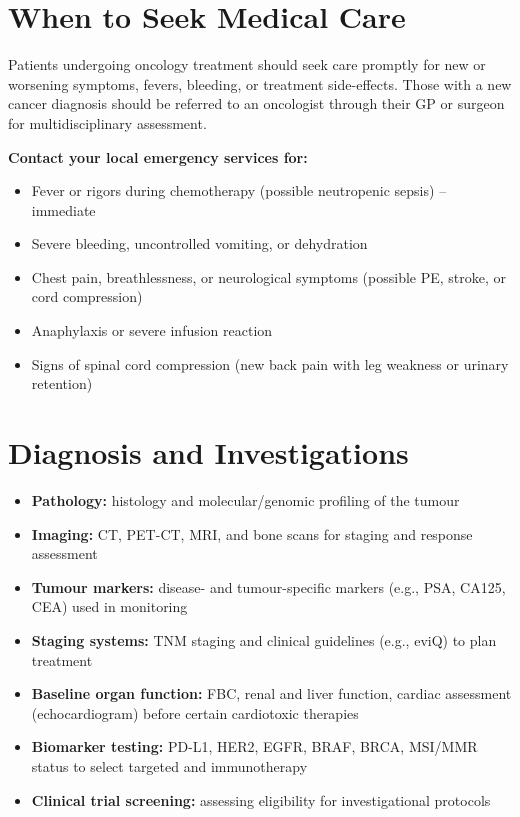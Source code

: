 \section*{When to Seek Medical Care}
Patients undergoing oncology treatment should seek care promptly for new or worsening symptoms, fevers, bleeding, or treatment side-effects. Those with a new cancer diagnosis should be referred to an oncologist through their GP or surgeon for multidisciplinary assessment.

\textbf{Contact your local emergency services for:}
\begin{itemize}
    \item Fever or rigors during chemotherapy (possible neutropenic sepsis) -- immediate
    \item Severe bleeding, uncontrolled vomiting, or dehydration
    \item Chest pain, breathlessness, or neurological symptoms (possible PE, stroke, or cord compression)
    \item Anaphylaxis or severe infusion reaction
    \item Signs of spinal cord compression (new back pain with leg weakness or urinary retention)
\end{itemize}

\section*{Diagnosis and Investigations}
\begin{itemize}
    \item \textbf{Pathology:} histology and molecular/genomic profiling of the tumour
    \item \textbf{Imaging:} CT, PET-CT, MRI, and bone scans for staging and response assessment
    \item \textbf{Tumour markers:} disease- and tumour-specific markers (e.g., PSA, CA125, CEA) used in monitoring
    \item \textbf{Staging systems:} TNM staging and clinical guidelines (e.g., eviQ) to plan treatment
    \item \textbf{Baseline organ function:} FBC, renal and liver function, cardiac assessment (echocardiogram) before certain cardiotoxic therapies
    \item \textbf{Biomarker testing:} PD-L1, HER2, EGFR, BRAF, BRCA, MSI/MMR status to select targeted and immunotherapy
    \item \textbf{Clinical trial screening:} assessing eligibility for investigational protocols
\end{itemize}

